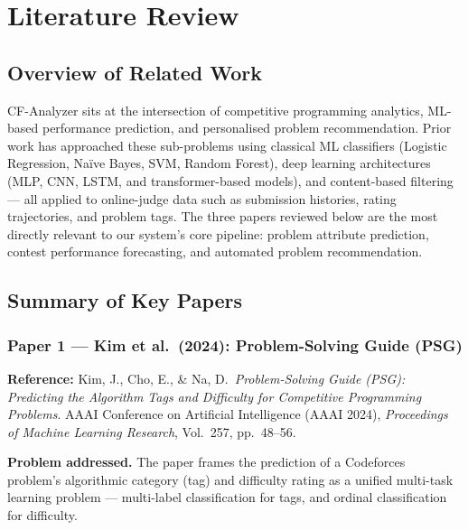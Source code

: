 \documentclass[12pt,a4paper]{article}
\begin{document}
 
\section{Literature Review}
 
\subsection{Overview of Related Work}
 
CF-Analyzer sits at the intersection of competitive programming analytics,
ML-based performance prediction, and personalised problem recommendation.
Prior work has approached these sub-problems using classical ML classifiers
(Logistic Regression, Naïve Bayes, SVM, Random Forest), deep learning
architectures (MLP, CNN, LSTM, and transformer-based models), and
content-based filtering — all applied to online-judge data such as
submission histories, rating trajectories, and problem tags.
The three papers reviewed below are the most directly relevant to our
system's core pipeline: problem attribute prediction, contest performance
forecasting, and automated problem recommendation.
 
\subsection{Summary of Key Papers}
 
\subsubsection*{Paper 1 — Kim et al.\ (2024): Problem-Solving Guide (PSG)}
 
\textbf{Reference:}
Kim, J., Cho, E., \& Na, D.\ \textit{Problem-Solving Guide (PSG):
Predicting the Algorithm Tags and Difficulty for Competitive Programming
Problems}. AAAI Conference on Artificial Intelligence (AAAI 2024),
\textit{Proceedings of Machine Learning Research}, Vol.\ 257,
pp.\ 48–56. \cite{kim2024psg}
 
\textbf{Problem addressed.}
The paper frames the prediction of a Codeforces problem's algorithmic
category (tag) and difficulty rating as a unified multi-task learning
problem — multi-label classification for tags, and ordinal classification
for difficulty.
 
\end{document}

